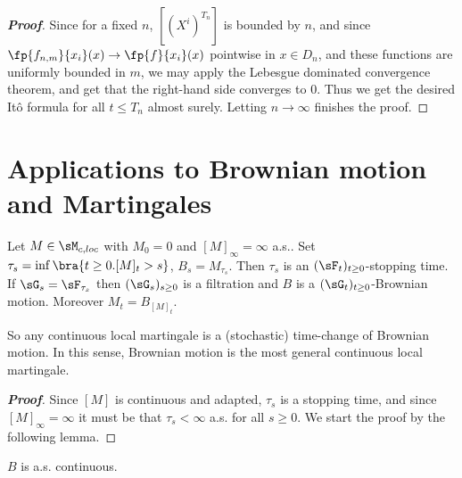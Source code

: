 \begin{proof}[\bf Proof]
Since for a fixed $n$, $[(X^i)^{T_n}]$ is bounded by $n$, and since $\fp{f_{n,m}}{x_i} (x) \to \fp{f}{x_i}(x)$ pointwise in $x \in D_n$, and these functions are uniformly bounded in $m$, we may apply the Lebesgue dominated convergence theorem, and get that the right-hand side converges to 0. Thus we
get the desired It\^o formula for all $t \leq T_n$ almost surely. Letting $n\to\infty$ finishes the proof. 
\end{proof}



\section{Applications to Brownian motion and Martingales}




\begin{theorem}
Let $M \in \sM_{c,loc}$ with $M_0 = 0$ and $[M]_\infty = \infty$ a.s.. Set $\tau_s = \inf\bra{t \geq 0 . [M]_t > s}$, $B_s = M_{\tau_s}$. Then $\tau_s$ is an $(\sF_t)_{t\geq0}$-stopping time. If $\sG_s = \sF_{\tau_s}$ then $(\sG_s)_{s\geq0}$ is a filtration and $B$ is a $(\sG_t)_{t\geq0}$-Brownian motion. Moreover $M_t = B_{[M]_t}$.
\end{theorem}

\begin{remark}
So any continuous local martingale is a (stochastic) time-change of Brownian motion. In this sense, Brownian motion is the most general continuous local martingale. 
\end{remark}

\begin{proof}[\bf Proof]
Since $[M]$ is continuous and adapted, $\tau_s$ is a stopping time, and since $[M]_\infty = \infty$ it must be that $\tau_s < \infty$ a.s. for all $s \geq 0$. We start the proof by the following lemma.
\end{proof}

\begin{lemma} 
$B$ is a.s. continuous.
\end{lemma}

